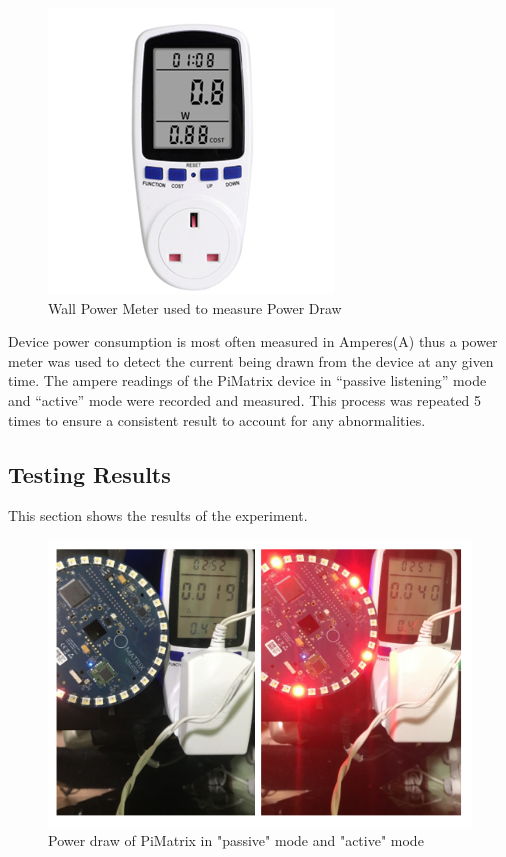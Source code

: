 \documentclass[hidelinks,12pt]{report} %
\begin{document}
\begin{figure}[h]
\centering
\includegraphics[scale = 1.0]{fig5.3} 
\caption{Wall Power Meter used to measure Power Draw}
\label{fig}
\end{figure}

Device power consumption is most often measured in Amperes(A) thus a power meter was used to detect the current being drawn from the device at any given time. The ampere readings of the PiMatrix device in “passive listening” mode and “active” mode were recorded and measured. This process was repeated 5 times to ensure a consistent result to account for any abnormalities.

\subsection{Testing Results}

This section shows the results of the experiment.


\begin{figure}[h]
\centering
\includegraphics[scale = 1.0]{fig5.4} 
\caption{Power draw of PiMatrix in "passive" mode and "active" mode}
\label{fig}
\end{figure}
\end{document}
